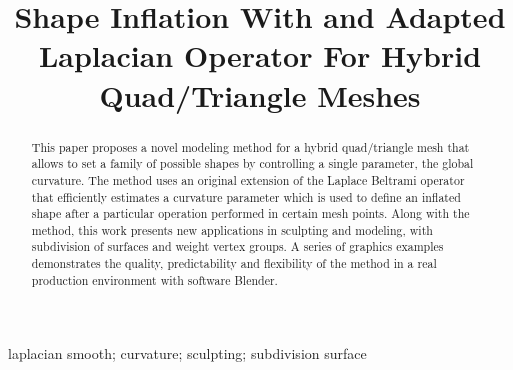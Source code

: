 \documentclass[10pt, conference]{IEEEtran}
\begin{document}
\title{Shape Inflation With and Adapted Laplacian Operator For Hybrid Quad/Triangle Meshes}

\newif\iffinal
\finaltrue
\newcommand{\jemsid}{99999}

\iffinal
  \author{%
  }
\else
  \author{Sibgrapi paper ID: \jemsid \\ }
\fi


\maketitle

\begin{abstract}
This paper proposes a novel modeling method for a hybrid quad/triangle
mesh that allows to set a family of possible shapes by controlling
a single parameter, the global curvature. The method uses an original
extension of the Laplace Beltrami operator that efficiently estimates
a curvature parameter which is used to define an inflated shape after
a particular operation performed in certain mesh points. Along with
the method, this work presents new applications in sculpting and modeling,
with subdivision of surfaces and weight vertex groups. A series of
graphics examples demonstrates the quality, predictability and flexibility
of the method in a real production environment with software Blender.

\end{abstract}

\begin{IEEEkeywords}
laplacian smooth; curvature; sculpting; subdivision surface

\end{IEEEkeywords}
\end{document}
